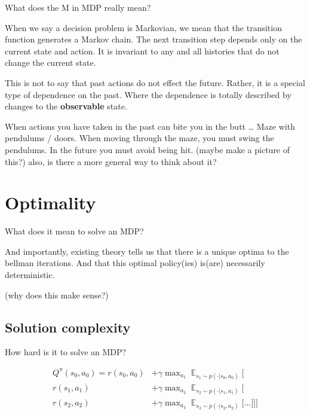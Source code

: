 \begin{displayquote}
  What does the M in MDP really mean?
\end{displayquote}

When we say a decision problem is Markovian, we mean that the transition
function generates a Markov chain. The next transition step depends only
on the current state and action. It is invariant to any and all histories that do not
change the current state.

This is not to say that past actions do not effect the future. Rather,
it is a special type of dependence on the past. Where the dependence is
totally described by changes to the \textbf{observable} state.


When actions you have taken in the past can bite you in the butt \ldots{}
Maze with pendulums / doors. When moving through the maze, you must
swing the pendulums. In the future you must avoid being hit. (maybe make
a picture of this?) also, is there a more general way to think about it?

\hypertarget{optimality}{%
\section{Optimality}\label{optimality}}

\begin{displayquote}
  What does it mean to solve an MDP?
\end{displayquote}

And importantly, existing theory tells us that there is a unique optima to the bellman iterations.
And that this optimal policy(ies) is(are) necessarily deterministic.

(why does this make sense?)

\hypertarget{solutions}{%
\subsection{Solution complexity}\label{solutions}}

\begin{displayquote}
  How hard is it to solve an MDP?
\end{displayquote}


\begin{align*}
Q^{\pi}(s_0, a_0) = r(s_0, a_0) &+ \gamma \mathop{\text{max}}_{a_1} \mathop{\mathbb E}_{s_1\sim p(\cdot | s_0, a_0)} \Bigg[ \\
r(s_1, a_1)  &+ \gamma \mathop{\text{max}}_{a_2} \mathop{\mathbb E}_{s_2\sim p(\cdot | s_1, a_1)} \bigg[\\
r(s_2, a_2)  &+ \gamma \mathop{\text{max}}_{a_3} \mathop{\mathbb E}_{s_3\sim p(\cdot | s_2, a_2)} \Big[
\dots \Big] \bigg] \Bigg]
\end{align*}

